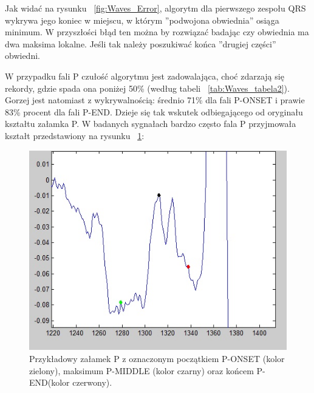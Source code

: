 Jak widać na rysunku ~\ref{fig:Waves_Error}, algorytm dla pierwszego zespołu QRS wykrywa jego koniec w miejscu, w którym ''podwojona obwiednia'' osiąga minimum. W przyszłości błąd ten można by rozwiązać badając czy obwiednia ma dwa maksima lokalne. Jeśli tak należy poszukiwać końca ''drugiej części'' obwiedni.

W przypadku fali P czułość algorytmu jest zadowalająca, choć zdarzają się rekordy, gdzie spada ona poniżej 50\% (według tabeli ~\ref{tab:Waves_tabela2}). Gorzej jest natomiast z wykrywalnością: średnio 71\% dla fali P-ONSET i prawie 83\% procent dla fali P-END. Dzieje się tak wskutek odbiegającego od oryginału kształtu załamka P. W badanych sygnałach bardzo często fala P przyjmowała kształt przedstawiony na rysunku ~\ref{fig:Waves_PrzykP}:

\begin{figure}[h!]
\centering
\includegraphics[width=\textwidth,keepaspectratio] {Waves/img/przykladowy_P.jpg}
\caption{Przykładowy załamek P z oznaczonym początkiem P-ONSET (kolor zielony), maksimum P-MIDDLE (kolor czarny) oraz końcem P-END(kolor czerwony).  }
\label{fig:Waves_PrzykP}
\end{figure}

